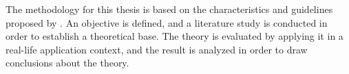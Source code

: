
The methodology for this thesis is based on the characteristics and
guidelines proposed by \citet{article:casestudies}. An objective is
defined, and a literature study is conducted in order to establish a
theoretical base. The theory is evaluated by applying it in a real-life
application context, and the result is analyzed in order to draw
conclusions about the theory.
